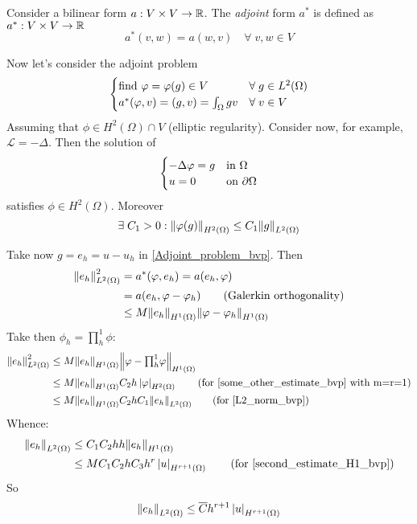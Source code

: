 \begin{definition}
    Consider a bilinear form \(a: V \times V \to \mathbb{R}\). The \textit{adjoint} form \(a^*\) is defined as \(a^*:V \times V \to \mathbb{R}\)
    \[
        a^*(v,w) = a(w,v) \quad \forall \; v,w \in V
    \]
\end{definition}
Now let's consider the adjoint problem 
\begin{equation}
    \begin{cases}
        \text{find } \varphi = \varphi(g) \in V & \forall \; g \in L^2(\Omega)\\ 
        a^*(\varphi,v) = (g,v) = \int_{\Omega} g v & \forall \; v \in V
    \end{cases}
    \label{Adjoint_problem_bvp}
\end{equation}
Assuming that \(\phi \in H^2(\Omega) \cap V\) (elliptic regularity). Consider now, for example, \(\mathcal{L} = -\Delta\). Then the solution of 
\begin{equation*}
    \begin{cases}
        -\Delta \varphi = g & \text{in } \Omega \\
        u = 0 & \text{on } \partial \Omega
    \end{cases}
\end{equation*}
satisfies \(\phi \in H^2(\Omega)\). Moreover
\begin{equation}
    \exists \; C_1 > 0 : \norm{\varphi(g)}_{H^2(\Omega)} \leq C_1 \norm{g}_{L^2(\Omega)}  \label{L2_norm_bvp}
\end{equation}
    
Take now \(g = e_h = u-u_h\) in \eqref{Adjoint_problem_bvp}. Then
\begin{align*}
    \norm{e_h}^2_{L^2(\Omega)} &= a^*(\phi, e_h) = a(e_h, \phi) \\ 
    &= a(e_h, \phi-\phi_h) \tag{\txt{Galerkin orthogonality}} \\
    &\leq M\norm{e_h}_{H^1(\Omega)}\norm{\phi-\phi_h}_{H^1(\Omega)}
\end{align*}
Take then \(\phi_h = \prod_{h}^{1}\phi\):
\begin{align*}
    \norm{e_h}^2_{L^2(\Omega)} &\leq M\norm{e_h}_{H^1(\Omega)}\norm{\phi - {\textstyle \prod_{h}^{1}}\phi}_{H^1(\Omega)} \\
    &\leq M\honenorm{e_h}C_2 h\seminorm{\phi}{H^2(\Omega)} \tag{for \eqref{some_other_estimate_bvp} with m=r=1} \\
    &\leq M \honenorm{e_h} C_2 h C_1 \ltwonorm{e_h} \tag{for \eqref{L2_norm_bvp}}
\end{align*}
Whence: 
\begin{align*}
    \ltwonorm{e_h} &\leq C_1 C_2 h h \honenorm{e_h} \\
    &\leq M C_1 C_2 h C_3 h^r \seminorm{u}{H^{r+1}(\Omega)} \tag{for \eqref{second_estimate_H1_bvp}}
\end{align*}
So 
\begin{equation}
    \norm{e_h}_{L^2(\Omega)} \leq \overline{C} h^{r+1} \left\lvert u\right\rvert_{H^{r+1}(\Omega)}
\end{equation}